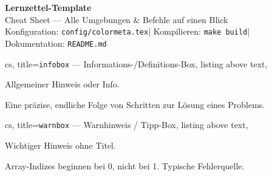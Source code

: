\documentclass[a4paper, 11pt, ngerman]{article}
\begin{document}
\thispagestyle{empty}

\begin{tcolorbox}[
  enhanced, arc=6pt, boxrule=0pt,
  colback=primary, coltext=white,
  left=16pt, right=16pt, top=13pt, bottom=13pt,
]
  {\huge\bfseries\sffamily Lernzettel-Template}%
  \\[0.3em]
  {\large\color{accent!80!white} Cheat Sheet — Alle Umgebungen \& Befehle auf einen Blick}\\[0.25em]
  {\small\color{white!65!primary}
    Konfiguration: \texttt{config/colormeta.tex}\enspace|\enspace
    Kompilieren: \texttt{make build}\enspace|\enspace
    Dokumentation: \texttt{README.md}
  }
\end{tcolorbox}

\vspace{0.55em}

\noindent
\begin{minipage}[t]{0.487\linewidth}
\begin{tcblisting}{cs,
  title={\texttt{infobox} — Informations-/Definitions-Box},
  listing above text,
}
\begin{infobox}
  Allgemeiner Hinweis oder Info.
\end{infobox}
\begin{infobox}
  Eine präzise, endliche Folge von
  Schritten zur Lösung eines Problems.
\end{infobox}
\end{tcblisting}
\end{minipage}%
\hfill
\begin{minipage}[t]{0.487\linewidth}
\begin{tcblisting}{cs,
  title={\texttt{warnbox} — Warnhinweis / Tipp-Box},
  listing above text,
}
\begin{warnbox}
  Wichtiger Hinweis ohne Titel.
\end{warnbox}
\begin{warnbox}
  Array-Indizes beginnen bei 0,
  nicht bei 1. Typische Fehlerquelle.
\end{warnbox}
\end{tcblisting}
\end{minipage}
\end{document}
